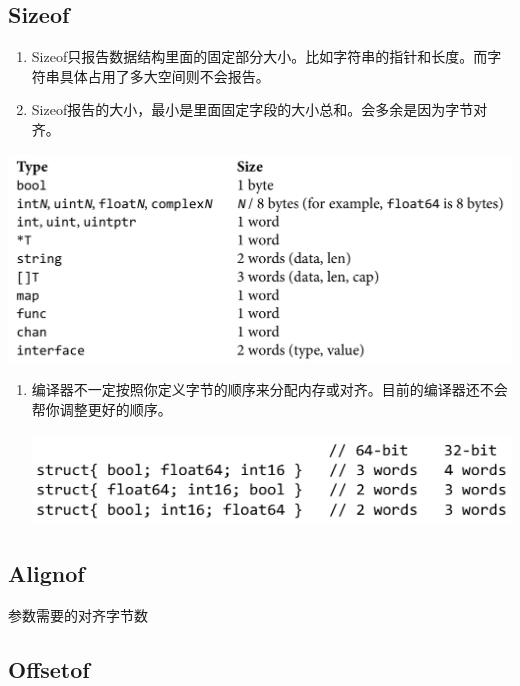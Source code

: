\hypertarget{sizeof}{%
\subsection{Sizeof}\label{sizeof}}

\begin{enumerate}
\tightlist
\item
  Sizeof只报告数据结构里面的固定部分大小。比如字符串的指针和长度。而字符串具体占用了多大空间则不会报告。
\item
  Sizeof报告的大小，最小是里面固定字段的大小总和。会多余是因为字节对齐。
\end{enumerate}

\includegraphics{./ch13/unsafe.Sizeof,_Alignof,_and_Offsetof/screenshot_2019-10-14_08-49-08.png}

\begin{enumerate}
\item
  编译器不一定按照你定义字节的顺序来分配内存或对齐。目前的编译器还不会帮你调整更好的顺序。

  \includegraphics{./ch13/unsafe.Sizeof,_Alignof,_and_Offsetof/screenshot_2019-10-14_08-51-47.png}
\end{enumerate}

\hypertarget{alignof}{%
\subsection{Alignof}\label{alignof}}

参数需要的对齐字节数

\hypertarget{offsetof}{%
\subsection{Offsetof}\label{offsetof}}

